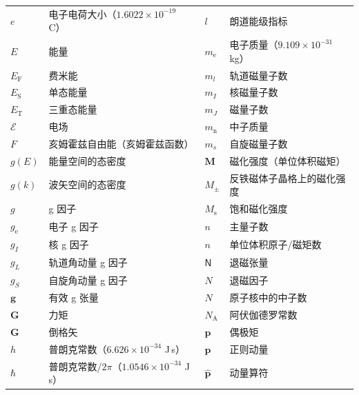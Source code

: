 \begin{center}
\begin{small}
\begin{tabular}{ll@{\hspace{3em}}ll}
$e$ & 电子电荷大小（$1.6022\times10^{-19}$ C） & $l$ & 朗道能级指标\\
$E$ & 能量 & $m_{\mathrm{e}}$ & 电子质量（$9.109\times10^{-31}$ kg）\\
$E_{\mathrm{F}}$ & 费米能 & $m_l$ & 轨道磁量子数\\
$E_{\mathrm{S}}$ & 单态能量 & $m_I$ & 核磁量子数\\
$E_{\mathrm{T}}$ & 三重态能量 & $m_J$ & 磁量子数\\
$\boldsymbol{\mathcal{E}}$ & 电场 & $m_{\mathrm{n}}$ & 中子质量\\
$F$ & 亥姆霍兹自由能（亥姆霍兹函数） & $m_s$ & 自旋磁量子数\\
$g(E)$ & 能量空间的态密度 & $\mathbf{M}$ & 磁化强度（单位体积磁矩）\\
$g(k)$ & 波矢空间的态密度 & $M_{\pm}$ & 反铁磁体子晶格上的磁化强度\\
$g$ & g 因子 & $M_{\mathrm{s}}$ & 饱和磁化强度\\
$g_{\mathrm{e}}$ & 电子 g 因子 & $n$ & 主量子数\\
$g_I$ & 核 g 因子 & $n$ & 单位体积原子/磁矩数\\
$g_L$ & 轨道角动量 g 因子 & $\mathsf{N}$ & 退磁张量\\
$g_S$ & 自旋角动量 g 因子 & $N$ & 退磁因子\\
$\mathbf{g}$ & 有效 g 张量 & $N$ & 原子核中的中子数\\
$\mathbf{G}$ & 力矩 & $N_{\mathrm{A}}$ & 阿伏伽德罗常数\\
$\mathbf{G}$ & 倒格矢 & $\mathbf{p}$ & 偶极矩\\
$h$ & 普朗克常数（$6.626\times10^{-34}$ J\,s） & $\mathbf{p}$ & 正则动量\\
$\hbar$ & 普朗克常数/$2\pi$（$1.0546\times10^{-34}$ J\,s） & $\hat{\mathbf{p}}$ & 动量算符\\
\bottomrule
\end{tabular}
\end{small}
\end{center}



